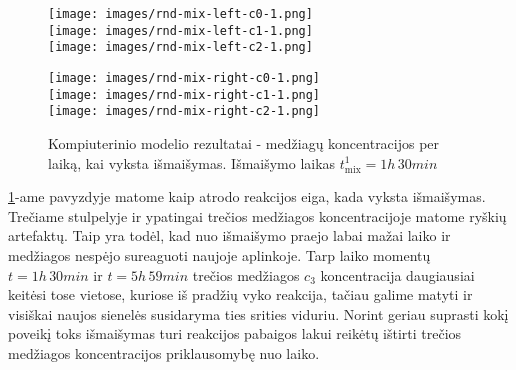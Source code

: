 

\begin{figure}[h]
    \centering
    \begin{minipage}[c]{0.40\textwidth}
        \centering
        \texttt{[image: images/rnd-mix-left-c0-1.png]}\\
        \texttt{[image: images/rnd-mix-left-c1-1.png]}\\
        \texttt{[image: images/rnd-mix-left-c2-1.png]}
    \end{minipage}%
    \hfill
    \begin{minipage}[c]{0.1\textwidth}
        \centering
    \end{minipage}%
    \hfill
    \begin{minipage}[c]{0.45\textwidth}
        \centering
        \texttt{[image: images/rnd-mix-right-c0-1.png]}\\
        \texttt{[image: images/rnd-mix-right-c1-1.png]}\\
        \texttt{[image: images/rnd-mix-right-c2-1.png]}
    \end{minipage}

    \caption{Kompiuterinio modelio rezultatai - medžiagų koncentracijos per laiką, kai vyksta išmaišymas. Išmaišymo laikas $t^1_\text{mix} = 1h\,30min$ }

    \label{mix-example}

\end{figure}

\ref{mix-example}-ame pavyzdyje matome kaip atrodo reakcijos eiga, kada vyksta išmaišymas. Trečiame stulpelyje ir ypatingai trečios medžiagos koncentracijoje matome ryškių artefaktų. Taip yra todėl, kad nuo išmaišymo praejo labai mažai laiko ir medžiagos nespėjo sureaguoti naujoje aplinkoje. Tarp laiko momentų $t=1h\,30min$ ir $t=5h\,59min$ trečios medžiagos $c_3$ koncentracija daugiausiai keitėsi tose vietose, kuriose iš pradžių vyko reakcija, tačiau galime matyti ir visiškai naujos sienelės susidaryma ties srities viduriu. Norint geriau suprasti kokį poveikį toks išmaišymas turi reakcijos pabaigos lakui reikėtų ištirti trečios medžiagos koncentracijos priklausomybę nuo laiko.

